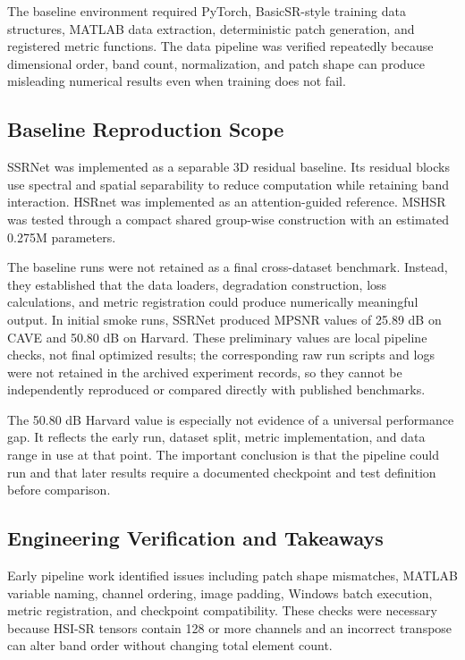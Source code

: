 \documentclass[10pt,twocolumn,letterpaper]{article}
\begin{document}
The baseline environment required PyTorch, BasicSR-style training data structures, MATLAB data extraction, deterministic patch generation, and registered metric functions. The data pipeline was verified repeatedly because dimensional order, band count, normalization, and patch shape can produce misleading numerical results even when training does not fail.

\subsection{Baseline Reproduction Scope}

SSRNet was implemented as a separable 3D residual baseline. Its residual blocks use spectral and spatial separability to reduce computation while retaining band interaction. HSRnet was implemented as an attention-guided reference. MSHSR was tested through a compact shared group-wise construction with an estimated 0.275M parameters.

The baseline runs were not retained as a final cross-dataset benchmark. Instead, they established that the data loaders, degradation construction, loss calculations, and metric registration could produce numerically meaningful output. In initial smoke runs, SSRNet produced MPSNR values of 25.89 dB on CAVE and 50.80 dB on Harvard. These preliminary values are local pipeline checks, not final optimized results; the corresponding raw run scripts and logs were not retained in the archived experiment records, so they cannot be independently reproduced or compared directly with published benchmarks.

The 50.80 dB Harvard value is especially not evidence of a universal performance gap. It reflects the early run, dataset split, metric implementation, and data range in use at that point. The important conclusion is that the pipeline could run and that later results require a documented checkpoint and test definition before comparison.

\subsection{Engineering Verification and Takeaways}

Early pipeline work identified issues including patch shape mismatches, MATLAB variable naming, channel ordering, image padding, Windows batch execution, metric registration, and checkpoint compatibility. These checks were necessary because HSI-SR tensors contain 128 or more channels and an incorrect transpose can alter band order without changing total element count.
\end{document}
